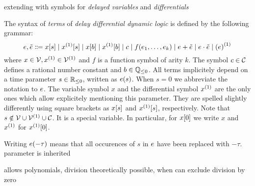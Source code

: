 extending \dL with symbols for \emph{delayed variables} and \emph{differentials}
    \begin{definition}[Terms]\label{def:syntax-terms}
        The syntax of \emph{terms} of \emph{delay differential dynamic logic} is defined by the following grammar:
        \begin{equation*}
            \astrm,\bstrm \Coloneqq
                \xtau[s] \mid
                \Dxtau[s] \mid
                \xtau[b] \mid
                \Dxtau[b] \mid
                c \mid
                f(\range{\istrm{1}}{\istrm{k}}) \mid
                \astrm + \bstrm \mid
                \astrm \cdot \bstrm \mid
                \D{(\astrm)}
        \end{equation*}
        where $x\in\allvars,\D{x}\in\diffvars$ and $f$ is a function symbol of arity $k$.
        The symbol $c\in\mathcal{C}_{}$ defines a rational number constant and $b\in\mathbb{Q}_{\leq 0}$.
        All terms implicitely depend on a time parameter $s\in\mathbb{R}_{\leq 0}$, written as $e(s)$. When $s=0$ we abbreviate the notation to $e$.
        The variable symbol $x$ and the differential symbol $\D{x}$ are the only ones which allow explicitely mentioning this parameter. They are spelled slightly differently using square brackets as $x[s]$ and $\Dxtau[s]$, respectively. Note that $s\notin\allvars\cup\diffvars\cup\constants$. It is a special variable.
        In particular, for $x[0]$ we write $x$ and $\D{x}$ for $\Dxtau[0]$.

        Writing $e(-\tau)$ means that all occurences of $s$ in $e$ have been replaced with $-\tau$.
        parameter is inherited

        allows polynomials,
        division theoretically possible, when can exclude division by zero

    \end{definition}


